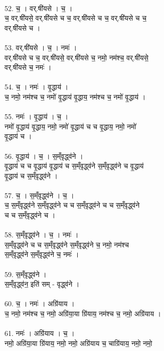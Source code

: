 \\
52. च॒ । वर्.षी॑यसे । च॒ ।\\
च॒ वर्.षी॑यसे॒ वर्.षी॑यसे च च॒ वर्.षी॑यसे च च॒ वर्.षी॑यसे च च॒\\
वर्.षी॑यसे च ।\\
\\
53. वर्.षी॑यसे । च॒ । नमः॑ ।\\
वर्.षी॑यसे च च॒ वर्.षी॑यसे॒ वर्.षी॑यसे च॒ नमो॒ नम॑श्च॒ वर्.षी॑यसे॒\\
वर्.षी॑यसे च॒ नमः॑ ।\\
\\
54. च॒ । नमः॑ । वृ॒द्धाय॑ ।\\
च॒ नमो॒ नम॑श्च च॒ नमो॑ वृ॒द्धाय॑ वृ॒द्धाय॒ नम॑श्च च॒ नमो॑ वृ॒द्धाय॑ ।\\
\\
55. नमः॑ । वृ॒द्धाय॑ । च॒ ।\\
नमो॑ वृ॒द्धाय॑ वृ॒द्धाय॒ नमो॒ नमो॑ वृ॒द्धाय॑ च च वृ॒द्धाय॒ नमो॒ नमो॑\\
वृ॒द्धाय॑ च ।\\
\\
56. वृ॒द्धाय॑ । च॒ । स॒म्ँवृद्ध्व॑ने ।\\
वृ॒द्धाय॑ च च वृ॒द्धाय॑ वृ॒द्धाय॑ च स॒म्ँवृद्ध्व॑ने स॒म्ँवृद्ध्व॑ने च वृ॒द्धाय॑\\
वृ॒द्धाय॑ च स॒म्ँवृद्ध्व॑ने ।\\
\\
57. च॒ । स॒म्ँवृद्ध्व॑ने । च॒ ।\\
च॒ स॒म्ँवृद्ध्व॑ने स॒म्ँवृद्ध्व॑ने च च स॒म्ँवृद्ध्व॑ने च च स॒म्ँवृद्ध्व॑ने\\
च च स॒म्ँवृद्ध्व॑ने च ।\\
\\
58. स॒म्ँवृद्ध्व॑ने । च॒ । नमः॑ ।\\
स॒म्ँवृद्ध्व॑ने च च स॒म्ँवृद्ध्व॑ने स॒म्ँवृद्ध्व॑ने च॒ नमो॒ नम॑श्च\\
स॒म्ँवृद्ध्व॑ने स॒म्ँवृद्ध्व॑ने च॒ नमः॑ ।\\
\\
59. स॒म्ँवृद्ध्व॑ने ।\\
स॒म्ँवृद्ध्व॑न॒ इति॑ सम् - वृद्ध्व॑ने ।\\
\\
60. च॒ । नमः॑ । अग्रि॑याय ।\\
च॒ नमो॒ नम॑श्च च॒ नमो॒ अग्रि॑या॒या ग्रि॑याय॒ नम॑श्च च॒ नमो॒ अग्रि॑याय ।\\
\\
61. नमः॑ । अग्रि॑याय । च॒ ।\\
नमो॒ अग्रि॑या॒या ग्रि॑याय॒ नमो॒ नमो॒ अग्रि॑याय च॒ चाग्रि॑याय॒ नमो॒ नमो॒\\
